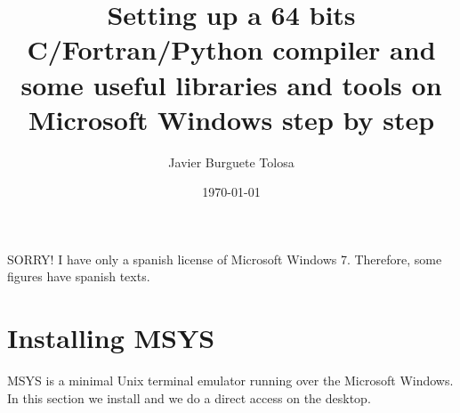 \documentclass[a4paper]{article}
\title{Setting up a 64 bits C/Fortran/Python compiler and some useful libraries
and tools on Microsoft Windows step by step}
\author{Javier Burguete Tolosa}
\date{\today}
\begin{document}
\maketitle

\tableofcontents

\section*{}

SORRY! I have only a spanish license of Microsoft Windows 7. Therefore, some
figures have spanish texts.

\clearpage

\section{Installing MSYS}

MSYS is a minimal Unix terminal emulator running over the Microsoft Windows. In
this section we install and we do a direct access on the desktop.
\end{document}
